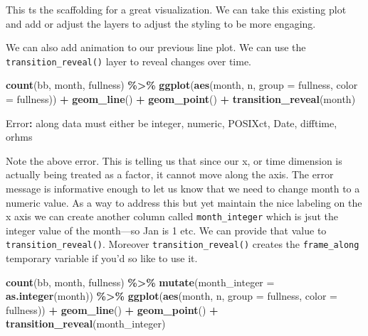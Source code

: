 \documentclass[
]{book}
\newenvironment{Shaded}{\begin{snugshade}}{\end{snugshade}}
\newcommand{\DataTypeTok}[1]{\textcolor[rgb]{0.13,0.29,0.53}{#1}}
\newcommand{\KeywordTok}[1]{\textcolor[rgb]{0.13,0.29,0.53}{\textbf{#1}}}
\newcommand{\NormalTok}[1]{#1}
\newcommand{\OperatorTok}[1]{\textcolor[rgb]{0.81,0.36,0.00}{\textbf{#1}}}
\newcommand{\StringTok}[1]{\textcolor[rgb]{0.31,0.60,0.02}{#1}}
\begin{document}
This ts the scaffolding for a great visualization. We can take this existing plot and add or adjust the layers to adjust the styling to be more engaging.

We can also add animation to our previous line plot. We can use the \texttt{transition\_reveal()} layer to reveal changes over time.

\begin{Shaded}
\begin{Highlighting}[]
\KeywordTok{count}\NormalTok{(bb, month, fullness) }\OperatorTok{\%\textgreater{}\%}\StringTok{ }
\StringTok{  }\KeywordTok{ggplot}\NormalTok{(}\KeywordTok{aes}\NormalTok{(month, n, }\DataTypeTok{group =}\NormalTok{ fullness, }\DataTypeTok{color =}\NormalTok{ fullness)) }\OperatorTok{+}
\StringTok{  }\KeywordTok{geom\_line}\NormalTok{() }\OperatorTok{+}\StringTok{ }
\StringTok{  }\KeywordTok{geom\_point}\NormalTok{() }\OperatorTok{+}
\StringTok{  }\KeywordTok{transition\_reveal}\NormalTok{(month)}

\NormalTok{Error}\OperatorTok{:}\StringTok{ }\NormalTok{along data must either be integer, numeric, POSIXct, Date, difftime, orhms}
\end{Highlighting}
\end{Shaded}

Note the above error. This is telling us that since our x, or time dimension is actually being treated as a factor, it cannot move along the axis. The error message is informative enough to let us know that we need to change month to a numeric value. As a way to address this but yet maintain the nice labeling on the x axis we can create another column called \texttt{month\_integer} which is jsut the integer value of the month---so Jan is 1 etc. We can provide that value to \texttt{transition\_reveal()}. Moreover \texttt{transition\_reveal()} creates the \texttt{frame\_along} temporary variable if you'd so like to use it.

\begin{Shaded}
\begin{Highlighting}[]
\KeywordTok{count}\NormalTok{(bb, month, fullness) }\OperatorTok{\%\textgreater{}\%}\StringTok{ }
\StringTok{  }\KeywordTok{mutate}\NormalTok{(}\DataTypeTok{month\_integer =} \KeywordTok{as.integer}\NormalTok{(month)) }\OperatorTok{\%\textgreater{}\%}\StringTok{ }
\StringTok{  }\KeywordTok{ggplot}\NormalTok{(}\KeywordTok{aes}\NormalTok{(month, n, }\DataTypeTok{group =}\NormalTok{ fullness, }\DataTypeTok{color =}\NormalTok{ fullness)) }\OperatorTok{+}
\StringTok{  }\KeywordTok{geom\_line}\NormalTok{() }\OperatorTok{+}\StringTok{ }
\StringTok{  }\KeywordTok{geom\_point}\NormalTok{() }\OperatorTok{+}
\StringTok{  }\KeywordTok{transition\_reveal}\NormalTok{(month\_integer)}
\end{Highlighting}
\end{Shaded}
\end{document}
